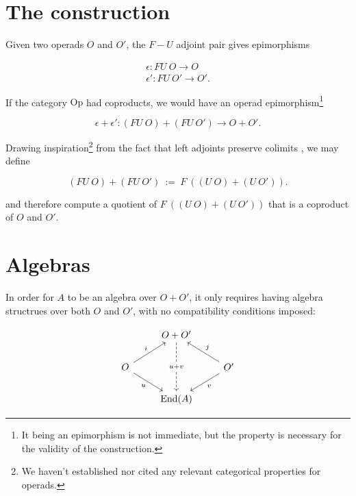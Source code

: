 \documentclass{amsart}
\begin{document}
	

\section{The construction}

Given two operads $O$ and $O'$, the $F-U$ adjoint pair gives epimorphisms 

\begin{eqnarray}\label{fu-epis}
	\epsilon : FU \ O \to O \\
	\epsilon' : FU \ O' \to O'.
\end{eqnarray}

If the category $\mathrm{Op}$ had coproducts, we would have an operad
epimorphism\footnote{It being an epimorphism is not immediate, but the
property is necessary for the validity of the construction.}

\begin{equation}\label{cpd-epis}
	\epsilon + \epsilon' : (FU \ O) + (FU \ O') \to O + O'.
\end{equation}

Drawing inspiration\footnote{We haven't established nor cited any relevant
categorical properties for operads.} from the fact that left adjoints
preserve colimits \cite{riehl-ctic}, we may define


\begin{equation}\label{fu-coprod}
	(FU \ O) + (FU \ O') \ := \ F \ \left( (U \ O) + (U \ O')
	\right).
\end{equation}

and therefore compute a quotient of $F \ \left( (U \ O) + (U \ O')
\right)$ that is a coproduct of $O$ and $O'$.

\section{Algebras}


In order for $A$ to be an algebra over $O + O'$, it only requires having
algebra structrues over both $O$ and $O'$, with no compatibility conditions
imposed:

\begin{equation}\label{opd-coprod}
		\begin{tikzcd}
			& O + O' \arrow[dd, dashed, "u + v" description] &
					\\
			O \arrow[rd, "u"'] \arrow[ru, "i"] & & O'
				\arrow[ld, "v"] \arrow[lu, "j"'] \\
			& \mathrm{End}(A) &
		\end{tikzcd}
\end{equation}
\end{document}
